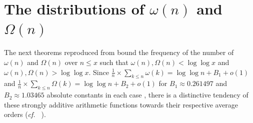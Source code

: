\documentclass[11pt,reqno,a4letter]{article}
\numberwithin{equation}{section}
\numberwithin{figure}{section}
\numberwithin{table}{section}
\newcommand{\cf}{\textit{cf.\ }}
\newcommand{\seqnum}[1]{\href{http://oeis.org/#1}{\color{ProcessBlue}{\underline{#1}}}}
\theoremstyle{plain}
\numberwithin{theorem}{section}
\theoremstyle{definition}
\begin{document}
%

\section{The distributions of $\omega(n)$ and $\Omega(n)$} 
\label{subSection_TheKnownDistsOfThePrimeOmegaFunctions_IntroResults_v1} 

The next theorems reproduced from \cite[\S 7.4]{MV} bound the frequency of the 
number of $\omega(n)$ and $\Omega(n)$ over $n \leq x$ such that 
$\omega(n),\Omega(n) < \log\log x$ and $\omega(n),\Omega(n) > \log\log x$. 
Since $\frac{1}{n} \times \sum_{k \leq n} \omega(k) = \log\log n + B_1 + o(1)$ and 
$\frac{1}{n} \times \sum_{k \leq n} \Omega(k) = \log\log n + B_2 + o(1)$ for 
$B_1 \approx 0.261497$ and $B_2 \approx 1.03465$ 
absolute constants in each case \cite[\S 22.10]{HARDYWRIGHT}, 
there is a distinctive tendency 
of these strongly additive arithmetic functions towards their respective average orders 
(\cf \cite{ERDOS-KAC-REF,BILLINGSLY-CLT-PRIMEDIVFUNC} \cite[\S 7.4]{MV}). 
\end{document}
